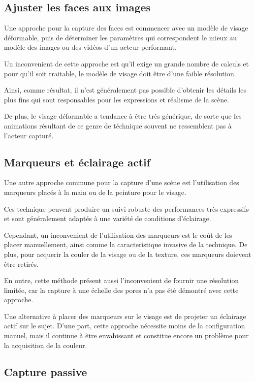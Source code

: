 \documentclass[a4paper,12pt]{article}
\begin{document}
\subsection*{Ajuster les faces aux images}
Une approche pour la capture des faces est commencer avec un modèle
de visage déformable, puis de déterminer les paramètres qui
correspondent le mieux au modèle des images ou des vidéos d'un acteur
performant. 

Un inconvenient de cette approche est qu'il exige un grande nombre de
calculs et pour qu'il soit traitable, le modèle de visage doit être
d'une faible résolution.

Ainsi, comme résultat, il n'est généralement pas possible d'obtenir les
détails les plus fins qui sont responsables pour les expressions et
réalisme de la scène.

De plus, le visage déformable a tendance à être très générique, de
sorte que les animations résultant de ce genre de téchnique souvent ne
ressemblent pas à l'acteur capturé.

\subsection*{Marqueurs et éclairage actif}

Une autre approche commune pour la capture d'une scène est
l'utilisation des marqueurs placés à la main ou de la peinture pour le
visage.

Ces technique peuvent produire un suivi robuste des performances très
expressifs et sont généralement adaptés à une variété de conditions
d'éclairage.

Cependant, un inconvenient de l'utilisation des marqueurs est le coût
de les placer manuellement, ainsi comme la caracteristique invasive de
la technique. De plus, pour acquerir la couler de la visage ou de la
texture, ces marqueurs doievent être retirés. 

En outre, cette méthode présent aussi l'inconvenient de fournir une
résolution limitée, car la capture à une échelle des pores n'a pas été
démontré avec cette approche. 

Une alternative à placer des marqueurs sur le visage est de projeter
un éclairage actif sur le sujet. D'une part, cette approche nécessite
moins de la configuration manuel, mais il continue à être envahissant
et constitue encore un problème pour la acquisition de la couleur. 

\subsection*{Capture passive }
\end{document}
